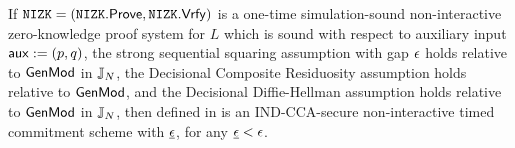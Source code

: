 %
%



\begin{theorem}
\label{thm:NITC-lin-ROM}
If $\mathtt{NIZK} = (\mathtt{NIZK}.\mathsf{Prove}, \mathtt{NIZK}.\mathsf{Vrfy})$ is a one-time simulation-sound non-interactive zero-knowledge proof system for $L$ which is sound with respect to auxiliary input $\mathsf{aux}:=(p,q)$, the strong sequential squaring assumption with gap $\epsilon$ holds relative to $\mathsf{GenMod}$ in $\mathbb{J}_N$, the Decisional Composite Residuosity assumption holds relative to $\mathsf{GenMod}$, and the Decisional Diffie-Hellman assumption holds relative to $\mathsf{GenMod}$ in $\mathbb{J}_N$, then \mathlist{(\pgen, \com, \cvrfy, \dvrfy, \fdecom)} defined in  is an IND-CCA-secure non-interactive timed commitment scheme with $\underline{\epsilon}$, for any $\underline{\epsilon} < \epsilon$. 
\end{theorem}




